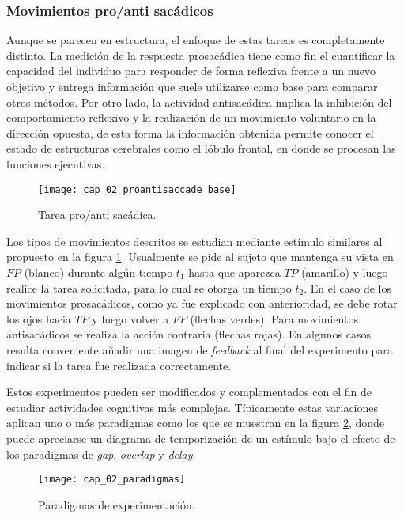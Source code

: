 \documentclass[../Main.tex]{subfiles}
\begin{document}
			\vspace{-5mm}
			\subsubsection{Movimientos pro/anti sacádicos}
			\label{ssub:movimientos_pro_anti_sacadicos}
				Aunque se parecen en estructura, el enfoque de estas tareas es completamente distinto. La medición de la respuesta prosacádica tiene como fin el cuantificar la capacidad del individuo para responder de forma reflexiva frente a un nuevo objetivo y entrega información que suele utilizarse como base para comparar otros métodos. Por otro lado, la actividad antisacádica implica la inhibición del comportamiento reflexivo y la realización de un movimiento voluntario en la dirección opuesta, de esta forma la información obtenida permite conocer el estado de estructuras cerebrales como el lóbulo frontal, en donde se procesan las funciones ejecutivas.	
				\begin{figure}[H]
					\centering
					\texttt{[image: cap\_02\_proantisaccade\_base]}
					\caption{Tarea pro/anti sacádica.}
					\label{fig:02_pro_anti_saccade_base}
				\end{figure}  

				Los tipos de movimientos descritos se estudian mediante estímulo similares al propuesto en la figura \ref{fig:02_pro_anti_saccade_base}. Usualmente se pide al sujeto que mantenga su vista en $FP$ (blanco) durante algún tiempo $t_1$ hasta que aparezca $TP$ (amarillo) y luego realice la tarea solicitada, para lo cual se otorga un tiempo $t_2$. En el caso de los movimientos prosacádicos, como ya fue explicado con anterioridad, se debe rotar los ojos hacia $TP$ y luego volver a $FP$ (flechas verdes). Para movimientos antisacádicos se realiza la acción contraria (flechas rojas). En algunos casos resulta conveniente añadir una imagen de \textit{feedback} al final del experimento para indicar si la tarea fue realizada correctamente. 

				Estos experimentos pueden ser modificados y complementados con el fin de estudiar actividades cognitivas más complejas. Típicamente estas variaciones aplican uno o más paradigmas como los que se muestran en la figura \ref{fig:02_paradigmas}, donde puede apreciarse un diagrama de temporización de un estímulo bajo el efecto de los paradigmas de \textit{gap}, \textit{overlap} y \textit{delay}. 
				\begin{figure}[H]
					\centering
					\texttt{[image: cap\_02\_paradigmas]}
					\caption{Paradigmas de experimentación.}
					\label{fig:02_paradigmas}
				\end{figure} 
\end{document}
